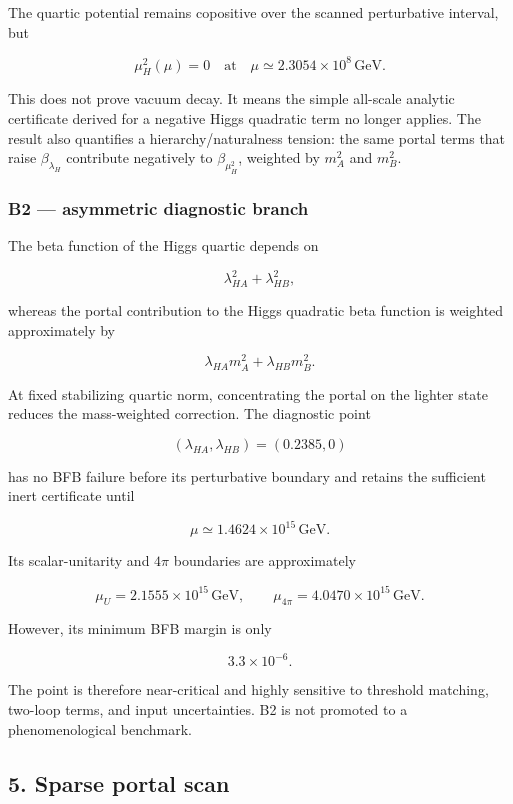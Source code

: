 \documentclass[
]{article}
\begin{document}
The quartic potential remains copositive over the scanned perturbative
interval, but

\[
\mu_H^2(\mu)=0
\quad\text{at}\quad
\mu\simeq2.3054\times10^8\,\mathrm{GeV}.
\]

This does not prove vacuum decay. It means the simple all-scale analytic
certificate derived for a negative Higgs quadratic term no longer
applies. The result also quantifies a hierarchy/naturalness tension: the
same portal terms that raise \(\beta_{\lambda_H}\) contribute negatively
to \(\beta_{\mu_H^2}\), weighted by \(m_A^2\) and \(m_B^2\).

\hypertarget{b2-asymmetric-diagnostic-branch}{%
\subsubsection{B2 --- asymmetric diagnostic
branch}\label{b2-asymmetric-diagnostic-branch}}

The beta function of the Higgs quartic depends on

\[
\lambda_{HA}^2+\lambda_{HB}^2,
\]

whereas the portal contribution to the Higgs quadratic beta function is
weighted approximately by

\[
\lambda_{HA}m_A^2+\lambda_{HB}m_B^2.
\]

At fixed stabilizing quartic norm, concentrating the portal on the
lighter state reduces the mass-weighted correction. The diagnostic point

\[
(\lambda_{HA},\lambda_{HB})=(0.2385,0)
\]

has no BFB failure before its perturbative boundary and retains the
sufficient inert certificate until

\[
\mu\simeq1.4624\times10^{15}\,\mathrm{GeV}.
\]

Its scalar-unitarity and \(4\pi\) boundaries are approximately

\[
\mu_U=2.1555\times10^{15}\,\mathrm{GeV},
\qquad
\mu_{4\pi}=4.0470\times10^{15}\,\mathrm{GeV}.
\]

However, its minimum BFB margin is only

\[
3.3\times10^{-6}.
\]

The point is therefore near-critical and highly sensitive to threshold
matching, two-loop terms, and input uncertainties. B2 is not promoted to
a phenomenological benchmark.

\hypertarget{sparse-portal-scan}{%
\subsection{5. Sparse portal scan}\label{sparse-portal-scan}}
\end{document}
